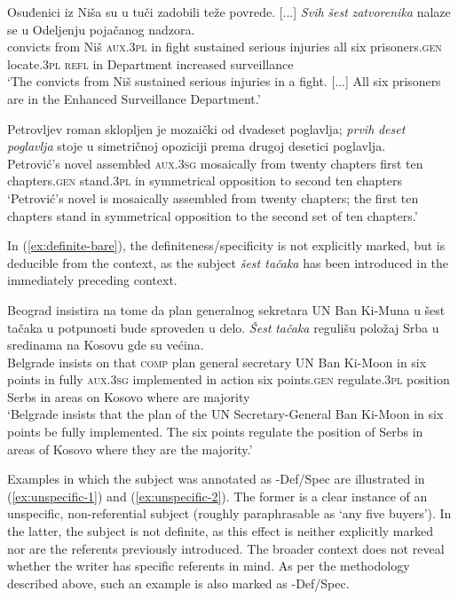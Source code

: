 \documentclass[output=paper,colorlinks,citecolor=brown
]{langscibook}
\begin{document}
\ea \label{ex:definite-animate}
\gll Osuđenici iz Niša su u tuči zadobili teže povrede. [...] \textit{Svih} \textit{šest} \textit{zatvorenika} nalaze se u Odeljenju pojačanog nadzora.\\
      convicts from Niš \textsc{aux}.3\textsc{pl} in fight sustained serious injuries {} all six prisoners.\textsc{gen} locate.\textsc{3pl} \textsc{refl} in Department increased surveillance\\
\glt `The convicts from Niš sustained serious injuries in a fight. [...] All six prisoners are in the Enhanced Surveillance Department.'
\z


\ea \label{ex:definite-inanimate}
\gll Petrovljev roman sklopljen je mozaički od dvadeset poglavlja; \textit{prvih} \textit{deset} \textit{poglavlja} stoje u simetričnoj opoziciji prema drugoj desetici poglavlja.\\
      Petrović's novel assembled \textsc{aux}.3\textsc{sg} mosaically from twenty chapters first ten chapters.\textsc{gen} stand.\textsc{3pl} in symmetrical opposition to second ten chapters\\
\glt `Petrović's novel is mosaically assembled from twenty chapters; the first ten chapters stand in symmetrical opposition to the second set of ten chapters.'
\z

\noindent In (\ref{ex:definite-bare}), the definiteness/specificity is not explicitly marked, but is deducible from the context, as the subject \textit{šest tačaka} has been introduced in the immediately preceding context.


\ea \label{ex:definite-bare}
\gll Beograd insistira na tome da plan generalnog sekretara UN Ban Ki-Muna u šest tačaka u potpunosti bude sproveden u delo. \textit{Šest} \textit{tačaka} regulišu položaj Srba u sredinama na Kosovu gde su većina.\\
      Belgrade insists on that \textsc{comp} plan general secretary UN Ban Ki-Moon in six points in fully \textsc{aux}.3\textsc{sg} implemented in action six points.\textsc{gen} regulate.\textsc{3pl} position Serbs in areas on Kosovo where are majority\\
\glt `Belgrade insists that the plan of the UN Secretary-General Ban Ki-Moon in six points be fully implemented. The six points regulate the position of Serbs in areas of Kosovo where they are the majority.'
\z


\noindent Examples in which the subject was annotated as -Def/Spec are illustrated in (\ref{ex:unspecific-1}) and (\ref{ex:unspecific-2}). The former is a clear instance of an unspecific, non-referential subject (roughly paraphrasable as `any five buyers'). In the latter, the subject is not definite, as this effect is neither explicitly marked nor are the referents previously introduced. The broader context does not reveal whether the writer has specific referents in mind. As per the methodology described above, such an example is also marked as -Def/Spec.
\end{document}
